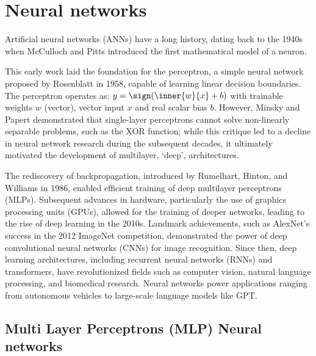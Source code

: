 \chapter{Neural networks}

Artificial neural networks (ANNs) have a long history, dating back to the 1940s when McCulloch and Pitts introduced the first mathematical model of a neuron.

This early work laid the foundation for the perceptron, a simple neural network proposed by Rosenblatt in 1958, capable of learning linear decision boundaries. The perceptron operates as: $y = \sign(\inner{w}{x} + b)$ with trainable weights $w$ (vector), vector input $x$ and real scalar bias $b$. However, Minsky and Papert \cite{turinici14} demonstrated that single-layer perceptrons cannot solve non-linearly separable problems, such as the XOR function; while this critique led to a decline in neural network research during the subsequent decades, it ultimately motivated the development of multilayer, `deep', architectures.

The rediscovery of backpropagation, introduced by Rumelhart, Hinton, and Williams in 1986, enabled efficient training of deep multilayer perceptrons (MLPs). Subsequent advances in hardware, particularly the use of graphics processing units (GPUs), allowed for the training of deeper networks, leading to the rise of deep learning in the 2010s. Landmark achievements, such as AlexNet's success in the 2012 ImageNet competition, demonstrated the power of deep convolutional neural networks (CNNs) for image recognition. Since then, deep learning architectures, including recurrent neural networks (RNNs) and transformers, have revolutionized fields such as computer vision, natural language processing, and biomedical research. Neural networks power applications ranging from autonomous vehicles to large-scale language models like GPT.

\section{Multi Layer Perceptrons (MLP) Neural networks}

